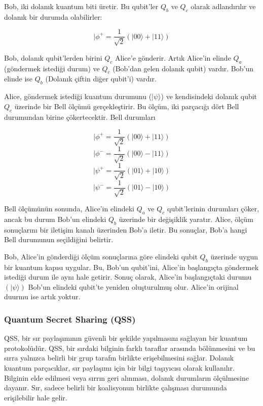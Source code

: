 Bob, iki dolanık kuantum biti üretir. Bu qubit'ler $Q_b$ ve $Q_c$ olarak adlandırılır ve dolanık bir durumda olabilirler:

\[ |\phi^{+} = \frac{1}{\sqrt{2}} (|00\rangle + |11\rangle) \]

Bob, dolanık qubit'lerden birini $Q_c$ Alice'e gönderir. Artık Alice'in elinde $Q_a$ (göndermek istediği durum) ve $Q_c$ (Bob'dan gelen dolanık qubit) vardır. Bob'un elinde ise $Q_b$ (Dolanık çiftin diğer qubit'i) vardır.

Alice, göndermek istediği kuantum durumunu ($|\psi\rangle$) ve kendisindeki dolanık qubit $Q_c$ üzerinde bir Bell ölçümü gerçekleştirir. Bu ölçüm, iki parçacığı dört Bell durumundan birine çökertecektir. Bell durumları

\[ |\phi^{+} = \frac{1}{\sqrt{2}} (|00\rangle + |11\rangle) \]
\[ |\phi^{-} = \frac{1}{\sqrt{2}} (|00\rangle - |11\rangle) \]
\[ |\psi^{+} = \frac{1}{\sqrt{2}} (|01\rangle + |10\rangle) \]
\[ |\psi^{-} = \frac{1}{\sqrt{2}} (|01\rangle - |10\rangle) \]

Bell ölçümünün sonunda, Alice'in elindeki $Q_a$ ve $Q_c$ qubit'lerinin durumları çöker, ancak bu durum Bob'un elindeki $Q_b$ üzerinde bir değişiklik yaratır. Alice, ölçüm sonuçlarını bir iletişim kanalı üzerinden Bob'a iletir. Bu sonuçlar, Bob'a hangi Bell durumunun seçildiğini belirtir.

Bob, Alice'in gönderdiği ölçüm sonuçlarına göre elindeki qubit $Q_b$ üzerinde uygun bir kuantum kapısı uygular. Bu, Bob'un qubit'ini, Alice'in başlangıçta göndermek istediği durum ile aynı hale getirir. Sonuç olarak, Alice'in başlangıçtaki durumu $(|\psi\rangle)$ Bob'un elindeki qubit'te yeniden oluşturulmuş olur. Alice'in orijinal duurmu ise artık yoktur.

\newpage

\subsubsection{Quantum Secret Sharing (QSS)}

QSS, bir sır paylaşımının güvenli bir şekilde yapılmasını sağlayan bir kuantum protokolüdür. QSS, bir sırdaki bilginin farklı taraflar arasında bölünmesini ve bu sırra yalnızca belirli bir grup tarafın birlikte erişebilmesini sağlar. Dolanık kuantum parçacıklar, sır paylaşımı için bir bilgi taşıyıcısı olarak kullanılır. Bilginin elde edilmesi veya sırrın geri alınması, dolanık durumların ölçülmesine dayanır. Sır, sadece belirli bir koalisyonun birlikte çalışması durumunda erişilebilir hale gelir.

